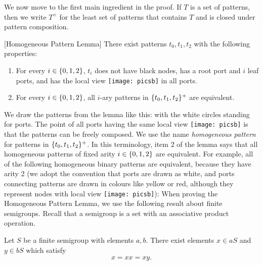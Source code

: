 \newcommand{\locview}{\texttt{[image: picsb]}\xspace}

We now move to the first main ingredient in the proof.  If $T$ is a set of patterns, then we write $T^+$ for the least set of patterns that contains $T$ and is closed under pattern composition.
\begin{lemma}\label{lem:patterns}[Homogeneous Pattern Lemma]
	There exist patterns $t_0,t_1,t_2$ with the following properties:
	\begin{enumerate}
		\item For every $i \in \{0,1,2\}$, $t_i$  does not have black nodes,   has a root port and $i$ leaf ports, and has the local view \locview in all ports.
		\item For every $i \in \{0,1,2\}$, all $i$-ary patterns in $\{t_0,t_1,t_2\}^+$  are equivalent.
	\end{enumerate}
\end{lemma}
We draw the patterns from the lemma like this:
with the white circles standing for ports. The point of all ports having the same local view \locview is that the patterns can be freely composed.
We use the name \emph{homogeneous pattern} for patterns in  $\{t_0,t_1,t_2\}^+$. In this terminology, item 2 of the lemma says that all homogeneous patterns of fixed arity $i \in \{0,1,2\}$ are equivalent. 
For example, all of the following homogeneous binary patterns are equivalent, because they have arity 2 (we adopt the convention that ports are drawn as white, and ports connecting patterns are drawn in colours like yellow or red, although they represent nodes with  local view \locview):
When proving the Homogeneous Pattern Lemma, we use the following result about finite semigroups. Recall that a semigroup is a set with an associative product operation.
\begin{lemma}
Let $S$ be a finite semigroup with elements $a,b$. There exist elements $x \in aS$ and $y \in bS$ which satisfy 
\begin{align*}
x = xx = xy.
\end{align*}
\end{lemma}

